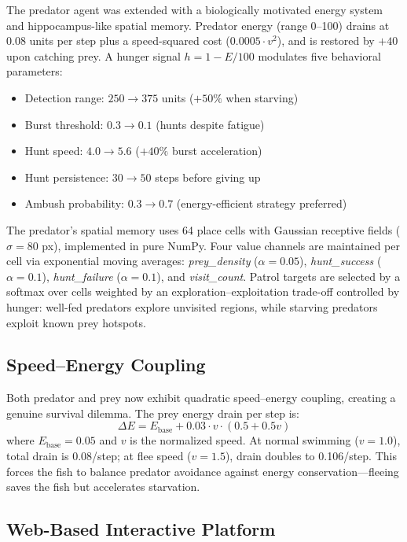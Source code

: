 \documentclass[11pt,a4paper]{article}
\begin{document}
The predator agent was extended with a biologically motivated energy system and hippocampus-like spatial memory. Predator energy (range 0--100) drains at 0.08 units per step plus a speed-squared cost ($0.0005 \cdot v^2$), and is restored by $+40$ upon catching prey. A hunger signal $h = 1 - E/100$ modulates five behavioral parameters:
\begin{itemize}
\item Detection range: $250 \to 375$ units ($+50\%$ when starving)
\item Burst threshold: $0.3 \to 0.1$ (hunts despite fatigue)
\item Hunt speed: $4.0 \to 5.6$ ($+40\%$ burst acceleration)
\item Hunt persistence: $30 \to 50$ steps before giving up
\item Ambush probability: $0.3 \to 0.7$ (energy-efficient strategy preferred)
\end{itemize}

The predator's spatial memory uses 64 place cells with Gaussian receptive fields ($\sigma = 80$ px), implemented in pure NumPy. Four value channels are maintained per cell via exponential moving averages: \textit{prey\_density} ($\alpha=0.05$), \textit{hunt\_success} ($\alpha=0.1$), \textit{hunt\_failure} ($\alpha=0.1$), and \textit{visit\_count}. Patrol targets are selected by a softmax over cells weighted by an exploration--exploitation trade-off controlled by hunger: well-fed predators explore unvisited regions, while starving predators exploit known prey hotspots.

\subsection{Speed--Energy Coupling}

Both predator and prey now exhibit quadratic speed--energy coupling, creating a genuine survival dilemma. The prey energy drain per step is:
\[
\Delta E = E_{\text{base}} + 0.03 \cdot v \cdot (0.5 + 0.5v)
\]
where $E_{\text{base}} = 0.05$ and $v$ is the normalized speed. At normal swimming ($v=1.0$), total drain is 0.08/step; at flee speed ($v=1.5$), drain doubles to 0.106/step. This forces the fish to balance predator avoidance against energy conservation---fleeing saves the fish but accelerates starvation.

\subsection{Web-Based Interactive Platform}
\end{document}
